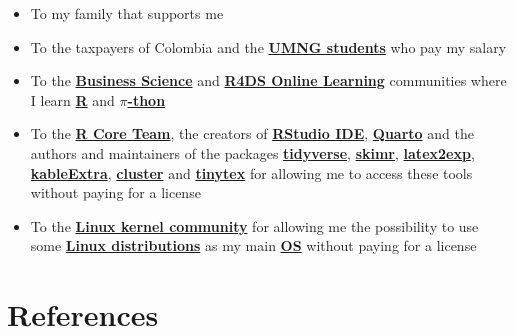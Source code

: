 \documentclass[
  ignorenonframetext,
]{beamer}
\begin{document}
\begin{frame}{}
\label{section-50}
\begin{itemize}
\item
  To my family that supports me
\item
  To the taxpayers of Colombia and the
  \href{https://www.umng.edu.co/estudiante}{\textbf{UMNG students}} who
  pay my salary
\item
  To the \href{https://www.business-science.io/}{\textbf{Business
  Science}} and \href{https://www.rfordatasci.com/}{\textbf{R4DS Online
  Learning}} communities where I learn
  \href{https://www.r-project.org/about.html}{\textbf{R}} and
  \href{https://www.python.org/about/}{\textbf{\(\pi\)-thon}}
\item
  To the \href{https://www.r-project.org/contributors.html}{\textbf{R
  Core Team}}, the creators of
  \href{https://posit.co/products/open-source/rstudio/}{\textbf{RStudio
  IDE}}, \href{https://quarto.org/}{\textbf{Quarto}} and the authors and
  maintainers of the packages
  \href{https://CRAN.R-project.org/package=tidyverse}{\textbf{tidyverse}},
  \href{https://CRAN.R-project.org/package=skimr}{\textbf{skimr}},
  \href{https://CRAN.R-project.org/package=latex2exp}{\textbf{latex2exp}},
  \href{https://CRAN.R-project.org/package=kableExtra}{\textbf{kableExtra}},
  \href{https://CRAN.R-project.org/package=cluster}{\textbf{cluster}}
  and
  \href{https://CRAN.R-project.org/package=tinytex}{\textbf{tinytex}}
  for allowing me to access these tools without paying for a license
\item
  To the \href{https://www.kernel.org/category/about.html}{\textbf{Linux
  kernel community}} for allowing me the possibility to use some
  \href{https://static.lwn.net/Distributions/}{\textbf{Linux
  distributions}} as my main
  \href{https://en.wikipedia.org/wiki/Operating_system}{\textbf{OS}}
  without paying for a license
\end{itemize}
\end{frame}

\section*{References}\label{references}
\end{document}
